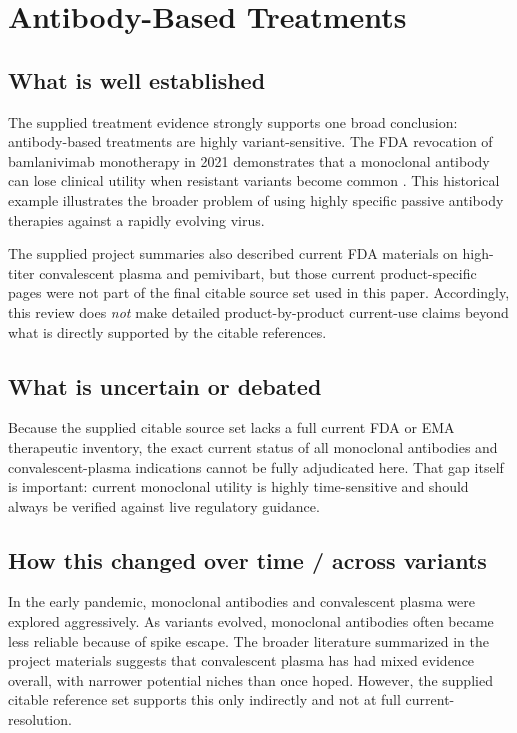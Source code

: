 \documentclass[12pt]{article}
\begin{document}
\section{Antibody-Based Treatments}
\subsection*{What is well established}
The supplied treatment evidence strongly supports one broad conclusion: antibody-based treatments are highly variant-sensitive. The FDA revocation of bamlanivimab monotherapy in 2021 demonstrates that a monoclonal antibody can lose clinical utility when resistant variants become common \cite{ref6}. This historical example illustrates the broader problem of using highly specific passive antibody therapies against a rapidly evolving virus.

The supplied project summaries also described current FDA materials on high-titer convalescent plasma and pemivibart, but those current product-specific pages were not part of the final citable source set used in this paper. Accordingly, this review does \emph{not} make detailed product-by-product current-use claims beyond what is directly supported by the citable references.

\subsection*{What is uncertain or debated}
Because the supplied citable source set lacks a full current FDA or EMA therapeutic inventory, the exact current status of all monoclonal antibodies and convalescent-plasma indications cannot be fully adjudicated here. That gap itself is important: current monoclonal utility is highly time-sensitive and should always be verified against live regulatory guidance.

\subsection*{How this changed over time / across variants}
In the early pandemic, monoclonal antibodies and convalescent plasma were explored aggressively. As variants evolved, monoclonal antibodies often became less reliable because of spike escape. The broader literature summarized in the project materials suggests that convalescent plasma has had mixed evidence overall, with narrower potential niches than once hoped. However, the supplied citable reference set supports this only indirectly and not at full current-resolution.
\end{document}
